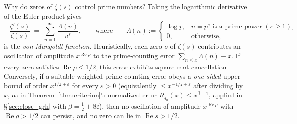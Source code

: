\documentclass[11pt]{amsart}
\newcommand{\eps}{\varepsilon}
\newcommand{\re}{\operatorname{Re}}
\theoremstyle{definition}
\theoremstyle{remark}
\begin{document}
Why do zeros of $\zeta(s)$ control prime numbers? Taking the logarithmic derivative of the Euler product gives
\[
 -\frac{\zeta'(s)}{\zeta(s)} \;=\; \sum_{n=1}^{\infty}\frac{\Lambda(n)}{n^s},
 \qquad\text{where}\qquad
 \Lambda(n) := \begin{cases}\log p,& n=p^e\text{ is a prime power } (e\ge 1),\\ 0,&\text{otherwise,}\end{cases}
\]
is the \emph{von Mangoldt function}. Heuristically, each zero $\rho$ of $\zeta(s)$ contributes an oscillation of amplitude $x^{\re\rho}$ to the prime-counting error $\sum_{n\le x}\Lambda(n)-x$. If every zero satisfies $\re\rho\le 1/2$, this error exhibits square-root cancellation. Conversely, if a suitable weighted prime-counting error obeys a \emph{one-sided} upper bound of order $x^{1/2+\eps}$ for every $\eps>0$ (equivalently $\le x^{-1/2+\eps}$ after dividing by $x$, as in Theorem~\ref{thm:criterion}'s normalized error $R_{q_0}(x)\le x^{\beta-1}$, applied in \S\ref{sec:close_grh} with $\beta=\frac12+8\eps$), then no oscillation of amplitude $x^{\re\rho}$ with $\re\rho>1/2$ can persist, and no zero can lie in $\re s>1/2$.
\end{document}
